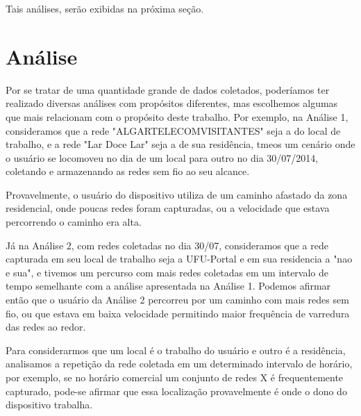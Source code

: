\documentclass[12pt, %
openright, 
oneside,
a4paper,
brazil]{facom-ufu-abntex2}
\begin{document}
 Tais análises, serão exibidas na próxima seção.

\section{Análise}
Por se tratar de uma quantidade grande de dados coletados, poderíamos ter realizado diversas análises com propósitos diferentes, mas escolhemos algumas que mais relacionam com o propósito deste trabalho. Por exemplo, na Análise 1, consideramos que a rede "ALGARTELECOMVISITANTES"  seja a do local de trabalho, e a rede "Lar Doce Lar" seja a de sua residência, tmeos um cenário onde o usuário se locomoveu no dia  de um local para outro no dia 30/07/2014, coletando e armazenando as redes sem fio ao seu alcance.


 Provavelmente, o usuário do dispositivo utiliza de um caminho afastado da zona residencial, onde poucas redes foram capturadas, ou a velocidade que estava percorrendo o caminho era alta.
 
 Já na Análise 2, com redes coletadas no dia 30/07, consideramos que a rede capturada em seu local de trabalho seja a UFU-Portal e em sua residencia a "nao e sua", e tivemos um percurso com mais redes coletadas em um intervalo de tempo semelhante com a análise apresentada na Análise 1. Podemos afirmar então que o usuário da Análise 2 percorreu por um caminho com mais redes sem fio, ou que estava em baixa velocidade permitindo maior frequência de varredura das redes ao redor.


Para considerarmos que um local é o trabalho do usuário e outro é a residência, analisamos a repetição da rede coletada em um determinado intervalo de horário, por exemplo, se no horário comercial um conjunto de redes X é frequentemente capturado, pode-se afirmar que essa localização provavelmente é onde o dono do dispositivo trabalha.
\end{document}

